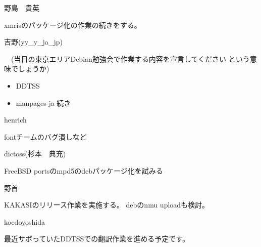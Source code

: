 \begin{prework}{ 野島　貴英 }

 xmrisのパッケージ化の作業の続きをする。

\end{prework}

\begin{prework}{ 吉野(yy\_{}y\_{}ja\_{}jp) }

　(当日の東京エリアDebian勉強会で作業する内容を宣言してください という意味でしょうか)
\begin{itemize}
\item DDTSS
\item manpages-ja 続き
\end{itemize}

\end{prework}

\begin{prework}{ henrich }

fontチームのバグ潰しなど

\end{prework}

\begin{prework}{ dictoss(杉本　典充) }

FreeBSD portsのmpd5のdebパッケージ化を試みる

\end{prework}

\begin{prework}{ 野首 }

KAKASIのリリース作業を実施する。
debのnmu uploadも検討。

\end{prework}

\begin{prework}{ koedoyoshida }

最近サボっていたDDTSSでの翻訳作業を進める予定です。
\end{prework}


